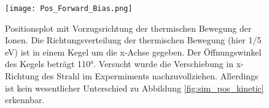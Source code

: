 \begin{figure}[H]
    \centering
    \texttt{[image: Pos\_Forward\_Bias.png]}
    \caption[Positionsplot mit Vorzugsrichtung der thermischen Bewegung]{Positionsplot mit Vorzugsrichtung der thermischen Bewegung der Ionen. Die Richtungsverteilung der thermischen Bewegung (hier 1/5 eV) ist in einem Kegel um die x-Achse gegeben. Der Öffnungswinkel des Kegels beträgt 110°. Versucht wurde die Verschiebung in x-Richtung des Strahl im Expermiments nachzuvollziehen. Allerdings ist kein wesentlicher Unterschied zu Abbildung \ref{fig:sim_pos_kinetic} erkennbar.}
    \label{fig:pos_bias}
\end{figure}